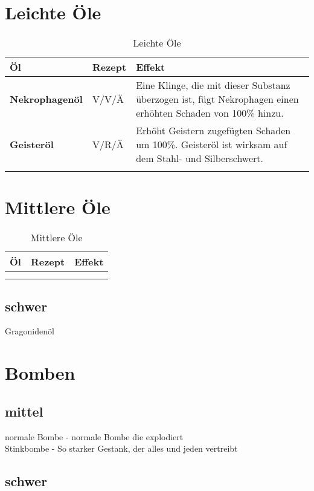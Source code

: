 \section{Leichte Öle}
\begin{longtable}{|p{4cm}|p{}|p{9cm}|}
\hline
\textbf{Öl} & \textbf{Rezept} & \textbf{Effekt} \\ \hline

\textbf{Nekrophagenöl} & V/V/Ä & Eine Klinge, die mit dieser Substanz überzogen ist, fügt Nekrophagen einen erhöhten Schaden von 100\% hinzu. \\ \hline

\textbf{Geisteröl} & V/R/Ä & Erhöht Geistern zugefügten Schaden um 100\%. Geisteröl ist wirksam auf dem Stahl- und Silberschwert.  \\ \hline

\caption{Leichte Öle}
\label{tab:leichte_oele}
\end{longtable}


\section{Mittlere Öle}
\begin{longtable}{|p{4cm}|p{}|p{9cm}|}
\hline
\textbf{Öl} & \textbf{Rezept} & \textbf{Effekt} \\ \hline

\textbf{} &  &  \\ \hline

\caption{Mittlere Öle}
\label{tab:mittlere_oele}
\end{longtable}


\subsection{schwer}
Gragonidenöl \\


\section{Bomben}
\subsection{mittel}
normale Bombe - normale Bombe die explodiert \\
Stinkbombe - So starker Gestank, der alles und jeden vertreibt \\

\subsection{schwer}




